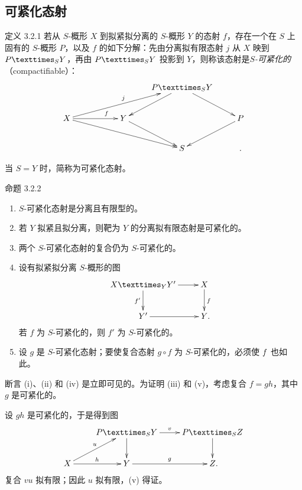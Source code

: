 \subsection{可紧化态射}

\begin{enonce*}{定义 3.2.1}
若从 $S$-概形 $X$ 到拟紧拟分离的 $S$-概形 $Y$ 的态射 $f$，存在一个在 $S$ 上固有的 $S$-概形 $P$，以及 $f$ 的如下分解：先由分离拟有限态射 $j$ 从 $X$ 映到 $\fprod{P}{Y}{S}$，再由 $\fprod{P}{Y}{S}$ 投影到 $Y$，则称该态射是\emph{$S$-可紧化的}（compactifiable）：
\[
\xymatrix{
                                & &  &\fprod{P}{Y}{S} \ar[rd]\ar[ld]& \\
X \ar[rr]^(.7){f} \ar[rrru]^{j}\ar[rrrd]& &Y \ar[rd]&                & P\ar[ld]\\
                                & &  &       S        &.
}
\]
\end{enonce*}

当 $S=Y$ 时，简称为可紧化态射。

\begin{enonce*}{命题 3.2.2}
\begin{enumerate}
\renewcommand{\theenumi}{\roman{enumi}}
\renewcommand{\labelenumi}{(\theenumi)}
\item $S$-可紧化态射\pageoriginale 是分离且有限型的。

\item 若 $Y$ 拟紧且拟分离，则靶为 $Y$ 的分离拟有限态射是可紧化的。

\item 两个 $S$-可紧化态射的复合仍为 $S$-可紧化的。

\item 设有拟紧拟分离 $S$-概形的图
\[
\xymatrix{
\fprod{X}{Y'}{Y} \ar[d]_{f'} \ar[r] & X \ar[d]^{f}      \\
Y' \ar[r]& Y\rlap{.}
}
\]
若 $f$ 为 $S$-可紧化的，则 $f'$ 为 $S$-可紧化的。

\item 设 $g$ 是 $S$-可紧化态射；要使复合态射 $g\circ f$ 为 $S$-可紧化的，必须使 $\sisi{h}{f}$ 也如此。
\end{enumerate}
\end{enonce*}

断言 (i)、(ii) 和 (iv) 是立即可见的。为证明 (iii) 和 (v)，考虑复合 $f=gh$，其中 $g$ 是可紧化的。

设 $gh$ 是可紧化的，于是得到图
\[
\xymatrix{
                     & \fprod{P}{Y}{S} \ar[d] \ar[r]^{v} & \fprod{P}{Z}{S}\ar[d] \\  X  \ar[ru]^{u} \ar[r]^{h}   & Y                \ar[r]^{g} &    Z\rlap{.}
}
\]
复合 $vu$ 拟有限；因此 $u$ 拟有限，(v) 得证。

